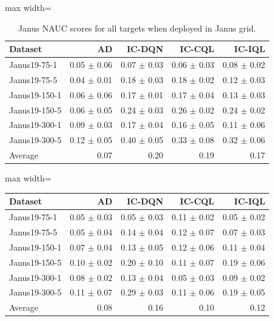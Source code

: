 \documentclass{article}
\begin{document}
\begin{table}[ht]
    \label{tab:}
    \begin{center}
    \caption{Janus NAUC scores for all targets when deployed in Janus grid.}
    \begin{small}
    \begin{adjustbox}{max width=\columnwidth}
		\begin{tabular}{l|rrrr}
		\toprule
	\textbf{Dataset} & \textbf{AD} & \textbf{IC-DQN} & \textbf{IC-CQL} & \textbf{IC-IQL}\\
\midrule
Janus19-75-1 & 0.05 $\pm$ 0.06 & 0.07 $\pm$ 0.03 & 0.06 $\pm$ 0.03 & 0.08 $\pm$ 0.02\\
Janus19-75-5 & 0.04 $\pm$ 0.01 & 0.18 $\pm$ 0.03 & 0.18 $\pm$ 0.02 & 0.12 $\pm$ 0.03\\
Janus19-150-1 & 0.06 $\pm$ 0.06 & 0.17 $\pm$ 0.01 & 0.17 $\pm$ 0.04 & 0.13 $\pm$ 0.03\\
Janus19-150-5 & 0.06 $\pm$ 0.05 & 0.24 $\pm$ 0.03 & 0.26 $\pm$ 0.02 & 0.24 $\pm$ 0.02\\
Janus19-300-1 & 0.09 $\pm$ 0.03 & 0.17 $\pm$ 0.04 & 0.16 $\pm$ 0.05 & 0.11 $\pm$ 0.06\\
Janus19-300-5 & 0.12 $\pm$ 0.05 & 0.40 $\pm$ 0.05 & 0.33 $\pm$ 0.08 & 0.32 $\pm$ 0.06\\
\midrule
Average & 0.07 & 0.20 & 0.19 & 0.17\\
\end{tabular}
        \end{adjustbox}
    \end{small}
    \end{center}
    \vskip -0.1in
\end{table}
\FloatBarrier
    \label{tab:}
    \begin{center}
    \begin{small}
    \begin{adjustbox}{max width=\columnwidth}
		\begin{tabular}{l|rrrr}
		\toprule
	\textbf{Dataset} & \textbf{AD} & \textbf{IC-DQN} & \textbf{IC-CQL} & \textbf{IC-IQL}\\
\midrule
Janus19-75-1 & 0.05 $\pm$ 0.03 & 0.05 $\pm$ 0.03 & 0.11 $\pm$ 0.02 & 0.05 $\pm$ 0.02\\
Janus19-75-5 & 0.05 $\pm$ 0.04 & 0.14 $\pm$ 0.04 & 0.12 $\pm$ 0.07 & 0.07 $\pm$ 0.03\\
Janus19-150-1 & 0.07 $\pm$ 0.04 & 0.13 $\pm$ 0.05 & 0.12 $\pm$ 0.06 & 0.11 $\pm$ 0.04\\
Janus19-150-5 & 0.10 $\pm$ 0.02 & 0.20 $\pm$ 0.10 & 0.11 $\pm$ 0.07 & 0.19 $\pm$ 0.06\\
Janus19-300-1 & 0.08 $\pm$ 0.02 & 0.13 $\pm$ 0.04 & 0.05 $\pm$ 0.03 & 0.09 $\pm$ 0.02\\
Janus19-300-5 & 0.11 $\pm$ 0.07 & 0.29 $\pm$ 0.03 & 0.11 $\pm$ 0.06 & 0.19 $\pm$ 0.05\\
\midrule
Average & 0.08 & 0.16 & 0.10 & 0.12\\
\end{tabular}
        \end{adjustbox}
    \caption{JANUS19}
    \end{small}
    \end{center}
\end{document}
